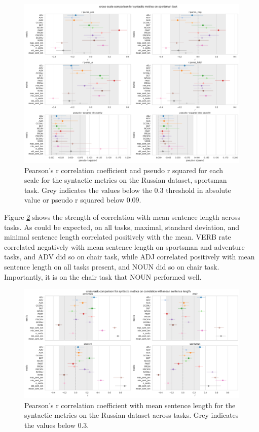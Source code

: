 \begin{figure}[ht!]
    \includegraphics[width=1.1\textwidth, center]{Figures/chapter_4/syntactic/ru_sportsman_scale_r.png} 
\captionsetup{width=\textwidth}
\caption[Syntactic Metrics: Russian, Sportsman Task]{\label{fig:results:syntactic:ru:sp} Pearson's r correlation coefficient and pseudo r squared for each scale for the syntactic metrics on the Russian dataset, sportsman task. Grey indicates the values below the 0.3 threshold in absolute value or pseudo r squared below 0.09.}
\end{figure}

\clearpage
Figure \ref{fig:results:syntactic:ru:corr_len} shows the strength of correlation with mean sentence length across tasks. As could be expected, on all tasks, maximal, standard deviation, and minimal sentence length correlated positively with the mean. VERB rate correlated negatively with mean sentence length on sportsman and adventure tasks, and ADV did so on chair task, while ADJ correlated positively with mean sentence length on all tasks present, and NOUN did so on chair task. Importantly, it is on the chair task that NOUN performed well. 

\begin{figure}[ht!]
    \includegraphics[width=1.1\textwidth, center]{Figures/chapter_4/syntactic/ru_corr_len.png} 
\captionsetup{width=\textwidth}
\caption[Syntactic Metrics: Russian, Length Correlation]{\label{fig:results:syntactic:ru:corr_len} Pearson's r correlation coefficient with mean sentence length for the syntactic metrics on the Russian dataset across tasks. Grey indicates the values below 0.3.}
\end{figure}

